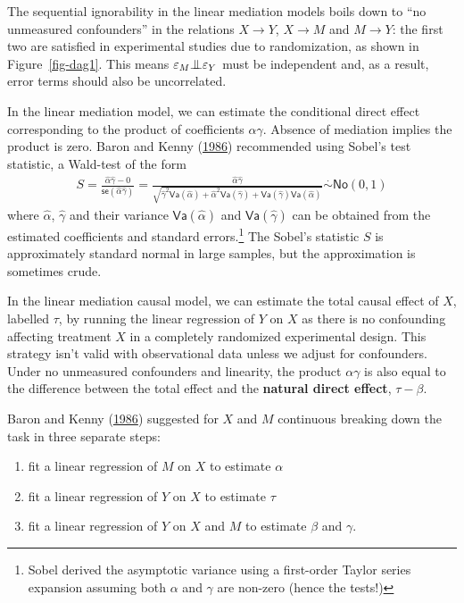 \documentclass[
  11pt,
  letterpaper,
]{scrbook}
\providecommand{\tightlist}{%
  \setlength{\itemsep}{0pt}\setlength{\parskip}{0pt}}\usepackage{longtable,booktabs,array}
\theoremstyle{definition}
\theoremstyle{remark}
\begin{document}
The sequential ignorability in the linear mediation models boils down to
``no unmeasured confounders'' in the relations \(X \to Y\), \(X \to M\)
and \(M \to Y\): the first two are satisfied in experimental studies due
to randomization, as shown in Figure~\ref{fig-dag1}. This means
\(\varepsilon_M {\perp\mkern-10mu\perp} \varepsilon_Y\) must be
independent and, as a result, error terms should also be uncorrelated.

In the linear mediation model, we can estimate the conditional direct
effect corresponding to the product of coefficients \(\alpha\gamma\).
Absence of mediation implies the product is zero. Baron and Kenny
(\protect\hyperlink{ref-Baron.Kenny:1986}{1986}) recommended using
Sobel's test statistic, a Wald-test of the form \begin{align*}
S  = \frac{\widehat{\alpha}\widehat{\gamma} - 0}{\mathsf{se}(\widehat{\alpha}\widehat{\gamma})} =  \frac{\widehat{\alpha}\widehat{\gamma}}{\sqrt{\widehat{\gamma}^2\mathsf{Va}(\widehat{\alpha}) + \widehat{\alpha}^2\mathsf{Va}(\widehat{\gamma}) + \mathsf{Va}(\widehat{\gamma})\mathsf{Va}(\widehat{\alpha})}} \stackrel{\cdot}{\sim}\mathsf{No}(0,1)
\end{align*} where \(\widehat{\alpha}\), \(\widehat{\gamma}\) and their
variance \(\mathsf{Va}(\widehat{\alpha})\) and
\(\mathsf{Va}(\widehat{\gamma})\) can be obtained from the estimated
coefficients and standard errors.\footnote{Sobel derived the asymptotic
  variance using a first-order Taylor series expansion assuming both
  \(\alpha\) and \(\gamma\) are non-zero (hence the tests!)} The Sobel's
statistic \(S\) is approximately standard normal in large samples, but
the approximation is sometimes crude.

In the linear mediation causal model, we can estimate the total causal
effect of \(X\), labelled \(\tau\), by running the linear regression of
\(Y\) on \(X\) as there is no confounding affecting treatment \(X\) in a
completely randomized experimental design. This strategy isn't valid
with observational data unless we adjust for confounders. Under no
unmeasured confounders and linearity, the product \(\alpha\gamma\) is
also equal to the difference between the total effect and the
\textbf{natural direct effect}, \(\tau - \beta\).

Baron and Kenny (\protect\hyperlink{ref-Baron.Kenny:1986}{1986})
suggested for \(X\) and \(M\) continuous breaking down the task in three
separate steps:

\begin{enumerate}
\def\labelenumi{\arabic{enumi})}
\tightlist
\item
  fit a linear regression of \(M\) on \(X\) to estimate \(\alpha\)
\item
  fit a linear regression of \(Y\) on \(X\) to estimate \(\tau\)
\item
  fit a linear regression of \(Y\) on \(X\) and \(M\) to estimate
  \(\beta\) and \(\gamma\).
\end{enumerate}
\end{document}
